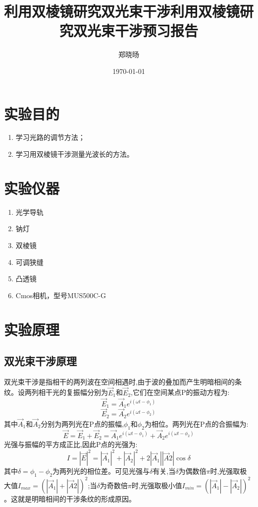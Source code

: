 \documentclass[UTF8]{ctexart}
\title{利用双棱镜研究双光束干涉}
\title{利用双棱镜研究双光束干涉预习报告}
\author{郑晓旸}
\date{\today}
\begin{document}
\fancyfoot[C]{\thepage}

\maketitle
\tableofcontents
\newpage

\section{实验目的}
    \begin{enumerate}
            \item 学习光路的调节方法；
            \item 学习用双棱镜干涉测量光波长的方法。
    \end{enumerate} 


\section{实验仪器}
\begin{enumerate}
    \item 光学导轨
    \item 钠灯
    \item 双棱镜
    \item 可调狭缝
    \item 凸透镜
    \item Cmos相机，型号MUS500C-G
\end{enumerate}

\section{实验原理}
\subsection{双光束干涉原理}
双光束干涉是指相干的两列波在空间相遇时,由于波的叠加而产生明暗相间的条纹。设两列相干光的复振幅分别为$\vec{E}_1$和$\vec{E}_2$,它们在空间某点P的振动方程为:\\
$$\vec{E}_1=\vec{A}_1e^{i(\omega t-\phi_1)}$$
$$\vec{E}_2=\vec{A}_2e^{i(\omega t-\phi_2)}$$
其中$\vec{A}_1$和$\vec{A}_2$分别为两列光在P点的振幅,$\phi_1$和$\phi_2$为相位。两列光在P点的合振幅为:
$$\vec{E}=\vec{E}_1+\vec{E}_2=\vec{A}_1e^{i(\omega t-\phi_1)}+\vec{A}_2e^{i(\omega t-\phi_2)}$$
光强与振幅的平方成正比,因此P点的光强为:
$$I=|\vec{E}|^2=|\vec{A}_1|^2+|\vec{A}_2|^2+2|\vec{A}_1||\vec{A}2|\cos\delta$$
其中$\delta=\phi_1-\phi_2$为两列光的相位差。可见光强与$\delta$有关,当$\delta$为偶数倍$\pi$时,光强取极大值$I_{max}=(|\vec{A}_1|+|\vec{A}2|)^2$;当$\delta$为奇数倍$\pi$时,光强取极小值$I_{min}=(|\vec{A}_1|-|\vec{A}_2|)^2$。这就是明暗相间的干涉条纹的形成原因。
\end{document}
